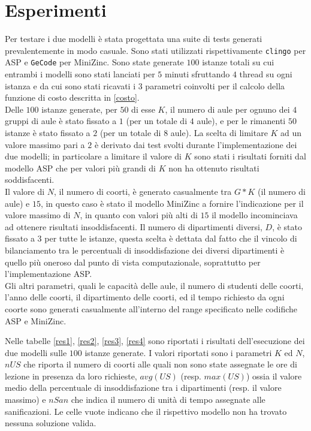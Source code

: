 \documentclass[12pt, italian, openany]{book}
\begin{document}
\chapter{Esperimenti}
Per testare i due modelli è stata progettata una suite di tests generati prevalentemente in modo casuale. 
Sono stati utilizzati rispettivamente \texttt{clingo} per ASP e \texttt{GeCode} per MiniZinc.
Sono state generate $100$ istanze totali su cui entrambi i modelli sono stati lanciati per $5$ minuti sfruttando $4$ thread su ogni istanza e da cui sono stati ricavati i $3$ parametri coinvolti per il calcolo della funzione di costo descritta in \ref{costo}.\\
Delle $100$ istanze generate, per $50$ di esse $K$, il numero di aule per ognuno dei $4$ gruppi di aule è stato fissato a $1$ (per un totale di $4$ aule), e per le rimanenti $50$ istanze è stato fissato a $2$ (per un totale di $8$ aule). La scelta di limitare $K$ ad un valore massimo pari a $2$ è derivato dai test svolti durante l'implementazione dei due modelli; in particolare a limitare il valore di $K$ sono stati i risultati forniti dal modello ASP che per valori più grandi di $K$ non ha ottenuto risultati soddisfacenti.\\
Il valore di $N$, il numero di coorti, è generato casualmente tra $G*K$ (il numero di aule) e $15$, in questo caso è stato il modello MiniZinc a fornire l'indicazione per il valore massimo di $N$, in quanto con valori più alti di $15$ il modello incominciava ad ottenere risultati insoddisfacenti.
Il numero di dipartimenti diversi, $D$, è stato fissato a $3$ per tutte le istanze, questa scelta è dettata dal fatto che il vincolo di bilanciamento tra le percentuali di insoddisfazione dei diversi dipartimenti è quello più oneroso dal punto di vista computazionale, soprattutto per l'implementazione ASP.\\
Gli altri parametri, quali le capacità delle aule, il numero di studenti delle coorti, l'anno delle coorti, il dipartimento delle coorti, ed il tempo richiesto da ogni coorte sono generati casualmente all'interno del range specificato nelle codifiche ASP e MiniZinc.

Nelle tabelle \ref{res1}, \ref{res2}, \ref{res3}, \ref{res4} sono riportati i risultati dell'esecuzione dei due modelli sulle $100$ istanze generate. I valori riportati sono i parametri $K$ ed $N$, $nUS$ che riporta il numero di coorti alle quali non sono state assegnate le ore di lezione in presenza da loro richieste, $avg(US)$ (resp. $max(US)$) ossia il valore medio della percentuale di insoddisfazione tra i dipartimenti (resp. il valore massimo) e $nSan$ che indica il numero di unità di tempo assegnate alle sanificazioni.
Le celle vuote indicano che il rispettivo modello non ha trovato nessuna soluzione valida.
\end{document}
